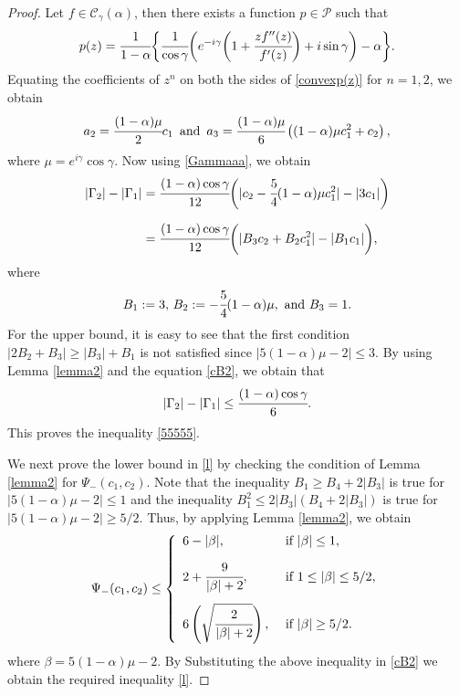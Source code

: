 \documentclass[a4paper,12pt]{amsart}
\theoremstyle{definition}
\numberwithin{equation}{section}
\begin{document}
\begin{proof}
Let $f\in \mathcal{C}_{\gamma}(\alpha)$, then there exists a function $p\in \mathcal{P}$ such that
\begin{equation}\label{convexp(z)}
p(z)=\cfrac{1}{1-\alpha}\bigg\{ \cfrac{1}{\cos \gamma}\bigg(e^{-i\gamma} \bigg(1+\cfrac{zf''(z)}{f'(z)}\bigg)+i\sin \gamma\bigg)-\alpha\bigg\}.
\end{equation}
Equating the coefficients of $z^n$ on both the sides of \eqref{convexp(z)} for $n=1,2$, we obtain
\begin{equation}\label{eqa2a3}
a_2=\cfrac{(1-\alpha)\mu}{2} c_1 \,\,\, \text{and} \,\,\,
	a_3=\cfrac{(1-\alpha)\mu}{6}\left((1-\alpha)\mu c_1^2+ c_2\right),
\end{equation}
where $\mu=e^{i\gamma}\cos \gamma$. Now using \eqref{Gammaaa}, we obtain
\begin{align}\label{cB2}
	|\Gamma_2|-|\Gamma_1|&=\cfrac{(1-\alpha)\cos \gamma}{12}\bigg(|c_2-\cfrac{5}{4}(1-\alpha)\mu c_1^2|-|3c_1|\bigg)\nonumber\\[2mm]
	&=\cfrac{(1-\alpha)\cos \gamma}{12}\bigg(|B_3c_2+B_2 c_1^2|-|B_1c_1|\bigg),
\end{align}
where
$$
B_1:=3,\,B_2:=-\cfrac{5}{4}(1-\alpha)\mu, \mbox{ and }B_3=1.
$$
For the upper bound, it is easy to see that the first condition $|2B_2+B_3|\ge |B_3|+B_1$ is not satisfied since $|5(1-\alpha)\mu-2|\le 3$. 
By using Lemma \ref{lemma2} and the equation \eqref{cB2}, we obtain that 
$$
|\Gamma_2|-|\Gamma_1| \le \cfrac{(1-\alpha)\cos \gamma}{6}.
$$
This proves the inequality \eqref{55555}.

\medskip

\noindent We next prove the lower bound in \eqref{l} by checking the condition of Lemma \ref{lemma2} for $\Psi_-(c_1,c_2)$. Note that the inequality $B_1\ge B_4+2|B_3|$ is true for $|5(1-\alpha)\mu-2|\le 1$
and the inequality $ B_1^2\le 2|B_3|(B_4+2|B_3|)$ is true for $|5(1-\alpha)\mu-2|\ge 5/2$. Thus, by applying Lemma \ref{lemma2}, we obtain
$$
\Psi_-(c_1,c_2)\le\left \{
\begin{array}{lll}
6-|\beta| , & {\mbox{ if }} |\beta| \le 1,\\[3mm]
2+\cfrac{9}{|\beta|+2}, & {\mbox{ if }} 1 \le |\beta| \le 5/2,\\[5mm]
6\left(\sqrt{\cfrac{2}{|\beta|+2}}\right), &{\mbox{ if }} |\beta| \ge 5/2.
\end{array}
\right.
$$
where $\beta=5(1-\alpha)\mu-2$. By Substituting the above inequality in \eqref{cB2} we obtain the required inequality \eqref{l}.


\end{proof}
\end{document}
